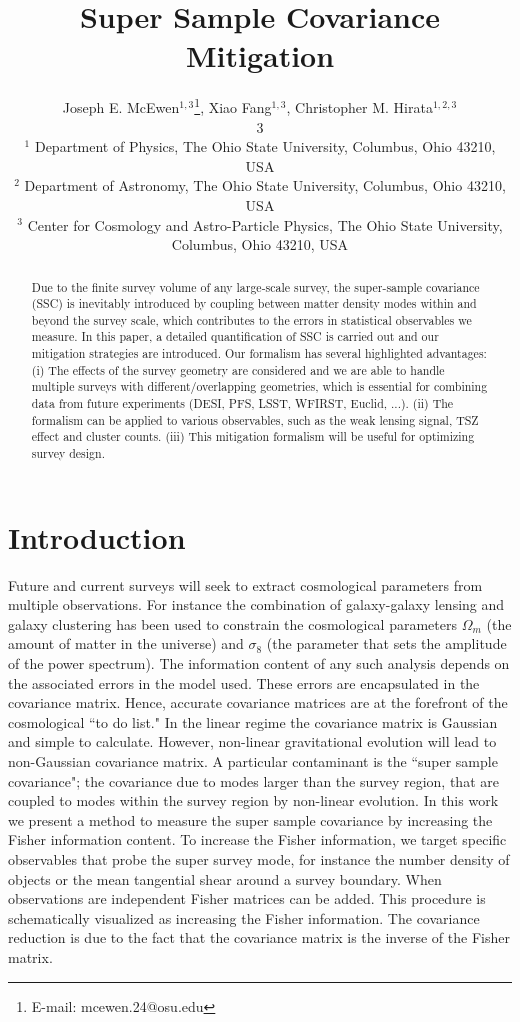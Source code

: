 \documentclass[11pt]{article}   			%
\title[]{Super Sample Covariance Mitigation}
\author[McEwen et al.]{ 
\parbox{\textwidth}{
Joseph E. McEwen$^{1,3}$\thanks{E-mail: mcewen.24@osu.edu},
Xiao Fang$^{1,3}$, 
Christopher M. Hirata$^{1,2,3}$}3
\\
$^1$ Department of Physics, The Ohio State University, Columbus, Ohio 43210, USA\\
$^2$ Department of Astronomy, The Ohio State University, Columbus, Ohio
43210, USA\\
$^3$ Center for Cosmology and Astro-Particle Physics, The Ohio State
University, Columbus, Ohio 43210, USA\\
}
\begin{document}
\maketitle

\begin{abstract}
Due to the finite survey volume of any large-scale survey, the super-sample covariance (SSC) is inevitably introduced by coupling between matter density modes within and beyond the survey scale, which contributes to the errors in statistical observables we measure. In this paper, a detailed quantification of SSC is carried out and our mitigation strategies are introduced. Our formalism has several highlighted advantages: (i) The effects of the survey geometry are considered and we are able to handle multiple surveys with different/overlapping geometries, which is essential for combining data from future experiments (DESI, PFS, LSST, WFIRST, Euclid, ...). (ii) The formalism can be applied to various observables, such as the weak lensing signal, TSZ effect and cluster counts. (iii) This mitigation formalism will be useful for optimizing survey design.
 \end{abstract}
 
 \section{Introduction}
Future and current surveys will seek to extract cosmological parameters from multiple observations. For instance the combination of galaxy-galaxy lensing and galaxy clustering has been used to constrain the cosmological parameters $\Omega_m$ (the amount of matter in the universe) and $\sigma_8$ (the parameter that sets the amplitude of the power spectrum). The information content of any such analysis depends on the associated errors in the model used. These errors are encapsulated in the covariance matrix. Hence, accurate covariance matrices are at the forefront of the cosmological ``to do list." In the linear regime the covariance matrix is Gaussian and simple to calculate. However, non-linear gravitational evolution will lead to non-Gaussian covariance matrix. A particular contaminant is the ``super sample covariance"; the covariance due to modes larger than the survey region, that are coupled to modes within the survey region by non-linear evolution. In this work we present a method to measure the super sample covariance by increasing the Fisher information content. To increase the Fisher information, we target specific observables that probe the super survey mode, for instance the number density of objects or the mean tangential shear around a survey boundary. When observations are independent Fisher matrices can be added. This procedure is schematically visualized as increasing the Fisher information. The covariance reduction is due to the fact that the covariance matrix is the inverse of the Fisher matrix.  

 
 
 
 
%
%
\end{document}
